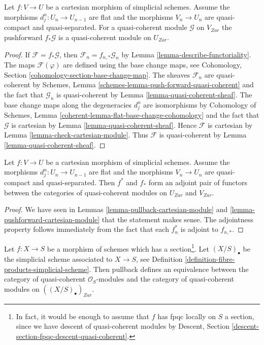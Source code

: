 \begin{lemma}
\label{lemma-pushforward-cartesian-module}
Let $f : V \to U$ be a cartesian morphism of simplicial schemes.
Assume the morphisms $d^n_j : U_n \to U_{n - 1}$ are
flat and the morphisms $V_n \to U_n$ are quasi-compact and quasi-separated.
For a quasi-coherent module $\mathcal{G}$ on $V_{Zar}$
the pushforward $f_*\mathcal{G}$ is a quasi-coherent module on $U_{Zar}$.
\end{lemma}

\begin{proof}
If $\mathcal{F} = f_* \mathcal{G}$, then
$\mathcal{F}_n = f_{n , *}\mathcal{G}_n$ by
Lemma \ref{lemma-describe-functoriality}.
The maps $\mathcal{F}(\varphi)$ are defined using the base change maps, see
Cohomology, Section \ref{cohomology-section-base-change-map}.
The sheaves $\mathcal{F}_n$ are quasi-coherent by
Schemes, Lemma \ref{schemes-lemma-push-forward-quasi-coherent}
and the fact that $\mathcal{G}_n$ is quasi-coherent
by Lemma \ref{lemma-quasi-coherent-sheaf}.
The base change maps along the degeneracies
$d^n_j$ are isomorphisms by Cohomology of Schemes, Lemma
\ref{coherent-lemma-flat-base-change-cohomology}
and the fact that $\mathcal{G}$ is cartesian
by Lemma \ref{lemma-quasi-coherent-sheaf}.
Hence $\mathcal{F}$ is cartesian by
Lemma \ref{lemma-check-cartesian-module}.
Thus $\mathcal{F}$ is quasi-coherent by
Lemma \ref{lemma-quasi-coherent-sheaf}.
\end{proof}

\begin{lemma}
\label{lemma-adjoint-functors-cartesian-modules}
Let $f : V \to U$ be a cartesian morphism of
simplicial schemes. Assume the morphisms $d^n_j : U_n \to U_{n - 1}$ are
flat and the morphisms $V_n \to U_n$ are quasi-compact and quasi-separated.
Then $f^*$ and $f_*$ form an adjoint pair of functors
between the categories of quasi-coherent modules on $U_{Zar}$ and $V_{Zar}$.
\end{lemma}

\begin{proof}
We have seen in Lemmas \ref{lemma-pullback-cartesian-module} and
\ref{lemma-pushforward-cartesian-module}
that the statement makes sense. The adjointness property follows
immediately from the fact that each $f_n^*$ is adjoint to $f_{n, *}$.
\end{proof}

\begin{lemma}
\label{lemma-cartesian-modules-with-section}
Let $f : X \to S$ be a morphism of schemes which has a
section\footnote{In fact, it would be enough to assume that $f$
has fpqc locally on $S$ a section, since we have descent of
quasi-coherent modules by Descent,
Section \ref{descent-section-fpqc-descent-quasi-coherent}.}.
Let $(X/S)_\bullet$ be the simplicial
scheme associated to $X \to S$, see
Definition \ref{definition-fibre-products-simplicial-scheme}.
Then pullback defines an equivalence between the category of
quasi-coherent $\mathcal{O}_S$-modules and the category of
quasi-coherent modules on $((X/S)_\bullet)_{Zar}$.
\end{lemma}

